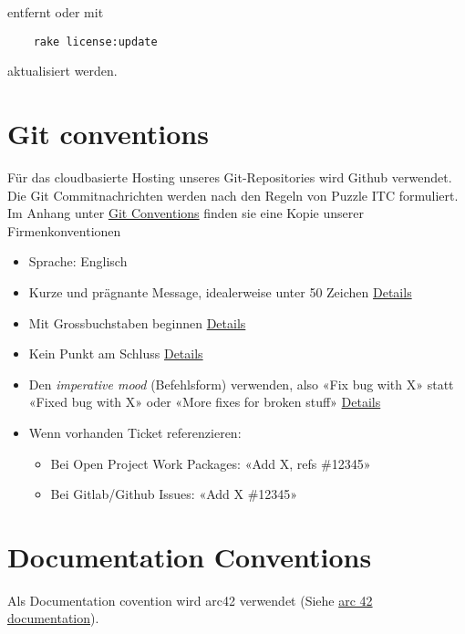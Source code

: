 entfernt oder mit 

\begin{verbatim}
    rake license:update 
\end{verbatim} aktualisiert werden.

\newpage

\section{Git conventions}
Für das cloudbasierte Hosting unseres Git-Repositories wird Github verwendet. 
Die Git Commitnachrichten werden nach den Regeln von Puzzle ITC formuliert. Im Anhang
unter \hyperref[sec:gitconv]{Git Conventions} finden sie eine Kopie unserer Firmenkonventionen

\begin{itemize}
    \item Sprache: Englisch
    \item Kurze und prägnante Message, idealerweise unter 50 Zeichen \href{https://cbea.ms/git-commit/#limit-50}{Details}
    \item Mit Grossbuchstaben beginnen \href{https://cbea.ms/git-commit/#capitalize}{Details}
    \item Kein Punkt am Schluss \href{https://cbea.ms/git-commit/#end}{Details}
    \item Den \textit{imperative mood} (Befehlsform) verwenden, also «Fix bug with X» statt «Fixed bug with X» oder «More fixes for broken stuff» \href{https://cbea.ms/git-commit/#imperative}{Details}
    \item Wenn vorhanden Ticket referenzieren:
    \begin{itemize}
        \item Bei Open Project Work Packages: «Add X, refs \#12345»
        \item Bei Gitlab/Github Issues: «Add X \#12345»
    \end{itemize}
\end{itemize}

\section{Documentation Conventions}
Als Documentation covention wird arc42 verwendet (Siehe \href{https://arc42.org/documentation/}{arc 42 documentation}). 

\newpage

